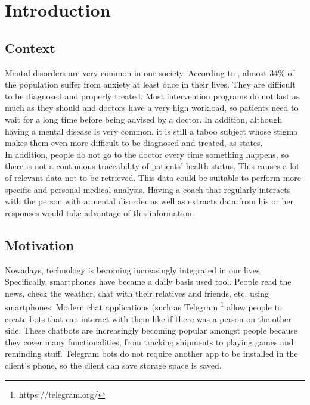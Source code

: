 \documentclass[12pt,english]{article}
\begin{document}


\thispagestyle{empty}
\newpage
\tableofcontents{}
\newpage

\section{Introduction}

\subsection{Context}

Mental disorders are very common in our society. According to \cite{Bandelow2015}, almost 34\% of the population suffer from anxiety at least once in their lives. They are difficult to be diagnosed and properly treated. Most intervention programs do not last as much as they should and doctors have a very high workload, so patients need to wait for a long time before being advised by a doctor. In addition, although having a mental disease is very common, it is still a taboo subject whose stigma makes them even more difficult to be diagnosed and treated, as \cite{Davies2000} states.\\

In addition, people do not go to the doctor every time something happens, so there is not a continuous traceability of patients' health status. This causes a lot of relevant data not to be retrieved. This data could be suitable to perform more specific and personal medical analysis. Having a coach that regularly interacts with the person with a mental disorder as well as extracts data from his or her responses would take advantage of this information.


\subsection{Motivation}

Nowadays, technology is becoming increasingly integrated in our lives. Specifically, smartphones have became a daily basis used tool. People read the news, check the weather, chat with their relatives and friends, etc. using smartphones. Modern chat applications (such as Telegram \footnote{https://telegram.org/} allow people to create bots that can interact with them like if there was a person on the other side. These chatbots are increasingly becoming popular amongst people because they cover many functionalities, from tracking shipments to playing games and reminding stuff. Telegram bots do not require another app to be installed in the client's phone, so the client can save storage space is saved.\\
\end{document}
